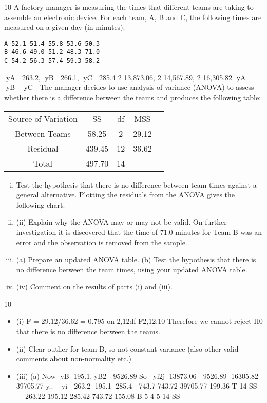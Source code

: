 \documentclass[a4paper,12pt]{article}
\begin{document}
\begin{enumerate}

10 A factory manager is measuring the times that different teams are taking to assemble an electronic device. For each team, A, B and C, the following times are measured on a given day (in minutes):

\begin{verbatim}
A 52.1 51.4 55.8 53.6 50.3
B 46.6 49.0 51.2 48.3 71.0
C 54.2 56.3 57.4 59.3 58.2
\end{verbatim}

yA  263.2, yB  266.1, yC  285.4
2 13,873.06, 2 14,567.89, 2 16,305.82 yA  yB  yC 
The manager decides to use analysis of variance (ANOVA) to assess whether there is a difference between the teams and produces the following table:
\begin{center}
\begin{tabular}{cccc}
  Source of Variation & SS & df & MSS& \\
Between Teams & 58.25&  2 & 29.12 & \\
Residual & 439.45 & 12 & 36.62 & \\
Total & 497.70 & 14 & & & \\
\end{tabular}
\end{center}
\begin{enumerate}[(i)]
\item  Test the hypothesis that there is no difference between team times against a general alternative. Plotting the residuals from the ANOVA gives the following chart:
\item (ii) Explain why the ANOVA may or may not be valid. 
On further investigation it is discovered that the time of 71.0 minutes for Team B was an error and the observation is removed from the sample.
\item  (a) Prepare an updated ANOVA table.
(b) Test the hypothesis that there is no difference between the team times, using your updated ANOVA table. 
\item (iv) Comment on the results of parts (i) and (iii). 
\end{enumerate}
\newpage

  10 
\begin{itemize}
\item (i) F = 29.12/36.62 = 0.795 on 2,12df
F2,12;10%
Therefore we cannot reject H0 that there is no difference between the teams.
\item (ii) Clear outlier for team B, so not constant variance (also other valid comments about non-normality etc.)
\item (iii) (a) Now yB 195.1,yB2  9526.89
So yi2j 13873.06  9526.89 16305.82  39705.77
y.. yi  263.2 195.1 285.4  743.7
743.72 39705.77 199.36
T 14 SS   
263.22 195.12 285.42 743.72 155.08
B 5 4 5 14 SS
 
      
 



\end{itemize}
\end{enumerate}
\end{document}
